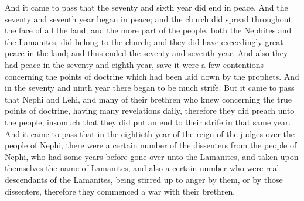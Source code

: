 And it came to pass that the seventy and sixth year did end in peace. And the seventy and seventh year began in peace; and the church did spread throughout the face of all the land; and the more part of the people, both the Nephites and the Lamanites, did belong to the church; and they did have exceedingly great peace in the land; and thus ended the seventy and seventh year.
\bverse \iffalse And also they had peace in the seventy and eighth year, save it were a few contentions concerning the points of doctrine which had been laid down by the prophets. \fi
And also they had peace in the seventy and eighth year, save it were a few contentions concerning the points of doctrine which had been laid down by the prophets.
\bverse \iffalse And in the seventy and ninth year there began to be much strife. But it came to pass that Nephi and Lehi, and many of their brethren who knew concerning the true points of doctrine, having many revelations daily, therefore they did preach unto the people, insomuch that they did put an end to their strife in that same year. \fi
And in the seventy and ninth year there began to be much strife. But it came to pass that Nephi and Lehi, and many of their brethren who knew concerning the true points of doctrine, having many revelations daily, therefore they did preach unto the people, insomuch that they did put an end to their strife in that same year.
\bverse \iffalse And it came to pass that in the eightieth year of the reign of the judges over the people of Nephi, there were a certain number of the dissenters from the people of Nephi, who had some years before gone over unto the Lamanites, and taken upon themselves the name of Lamanites, and also a certain number who were real descendants of the Lamanites, being stirred up to anger by them, or by those dissenters, therefore they commenced a war with their brethren. \fi
And it came to pass that in the eightieth year of the reign of the judges over the people of Nephi, there were a certain number of the dissenters from the people of Nephi, who had some years before gone over unto the Lamanites, and taken upon themselves the name of Lamanites, and also a certain number who were real descendants of the Lamanites, being stirred up to anger by them, or by those dissenters, therefore they commenced a war with their brethren.
\bverse \iffalse And they did commit murder and plunder; and then they would retreat back into the mountains, and into the wilderness and secret places, hiding themselves that they could not be discovered, receiving daily an addition to their numbers, inasmuch as there were dissenters that went forth unto them. \fi
